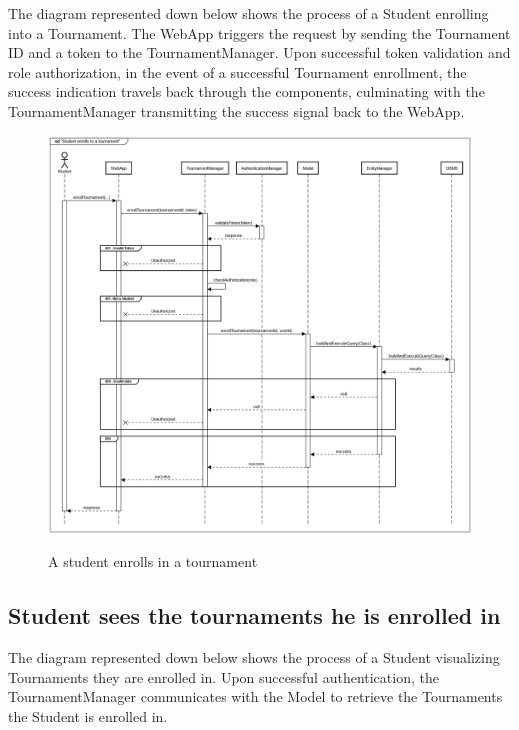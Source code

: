 \documentclass{Configuration_Files/Template}
\begin{document}
The diagram represented down below shows the process of a Student enrolling into a Tournament. The WebApp triggers the request by sending the Tournament ID and a token to the TournamentManager. Upon successful token validation and role authorization, in the event of a successful Tournament enrollment, the success indication travels back through the components, culminating with the TournamentManager transmitting the success signal back to the WebApp.

\begin{figure}[H]
\centering
\includegraphics[scale = 0.33]{Images/diagrams/sequences/enrollTournament.png}\\
\caption{A student enrolls in a tournament  }
\end{figure}

\subsection{Student sees the tournaments he is enrolled in}

The diagram represented down below shows the process of a Student visualizing Tournaments they are enrolled in. Upon successful authentication, the TournamentManager communicates with the Model to retrieve the Tournaments the Student is enrolled in.
\end{document}
